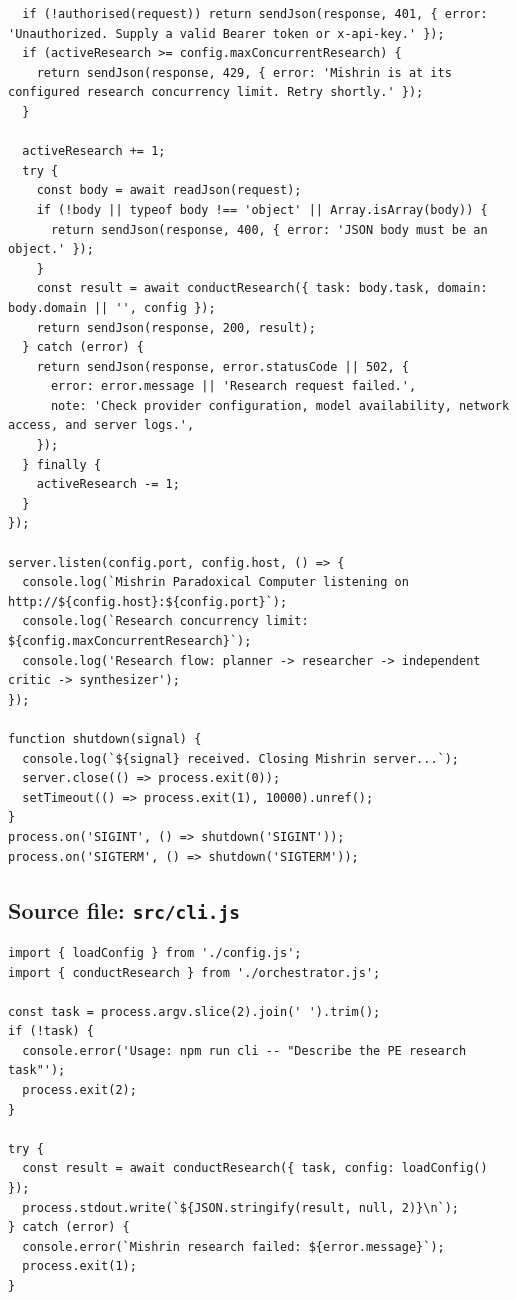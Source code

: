 \documentclass[10pt,a4paper]{article}
\begin{document}
\begin{lstlisting}
  if (!authorised(request)) return sendJson(response, 401, { error: 'Unauthorized. Supply a valid Bearer token or x-api-key.' });
  if (activeResearch >= config.maxConcurrentResearch) {
    return sendJson(response, 429, { error: 'Mishrin is at its configured research concurrency limit. Retry shortly.' });
  }

  activeResearch += 1;
  try {
    const body = await readJson(request);
    if (!body || typeof body !== 'object' || Array.isArray(body)) {
      return sendJson(response, 400, { error: 'JSON body must be an object.' });
    }
    const result = await conductResearch({ task: body.task, domain: body.domain || '', config });
    return sendJson(response, 200, result);
  } catch (error) {
    return sendJson(response, error.statusCode || 502, {
      error: error.message || 'Research request failed.',
      note: 'Check provider configuration, model availability, network access, and server logs.',
    });
  } finally {
    activeResearch -= 1;
  }
});

server.listen(config.port, config.host, () => {
  console.log(`Mishrin Paradoxical Computer listening on http://${config.host}:${config.port}`);
  console.log(`Research concurrency limit: ${config.maxConcurrentResearch}`);
  console.log('Research flow: planner -> researcher -> independent critic -> synthesizer');
});

function shutdown(signal) {
  console.log(`${signal} received. Closing Mishrin server...`);
  server.close(() => process.exit(0));
  setTimeout(() => process.exit(1), 10000).unref();
}
process.on('SIGINT', () => shutdown('SIGINT'));
process.on('SIGTERM', () => shutdown('SIGTERM'));
\end{lstlisting}
\subsection{Source file: \texttt{src/cli.js}}
\begin{lstlisting}
import { loadConfig } from './config.js';
import { conductResearch } from './orchestrator.js';

const task = process.argv.slice(2).join(' ').trim();
if (!task) {
  console.error('Usage: npm run cli -- "Describe the PE research task"');
  process.exit(2);
}

try {
  const result = await conductResearch({ task, config: loadConfig() });
  process.stdout.write(`${JSON.stringify(result, null, 2)}\n`);
} catch (error) {
  console.error(`Mishrin research failed: ${error.message}`);
  process.exit(1);
}
\end{lstlisting}
\end{document}
